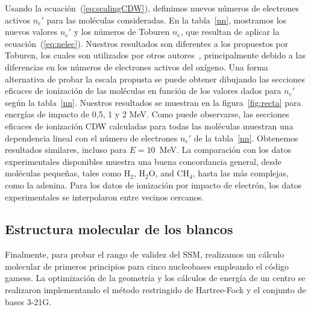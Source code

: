 Usando la ecuación~(\ref{eq:scalingCDW}), definimos nuevos números de 
electrones activos $n_e'$ para las moléculas consideradas. En la 
tabla~\ref{nn}, mostramos los nuevos valores $n_e'$ y los números de 
Toburen $n_e$, que resultan de aplicar la ecuación~(\ref{eq:nelec}). 
Nuestros resultados son diferentes a los propuestos por Toburen, los 
cuales son utilizados por otros autores~\cite{itoh2013}, principalmente 
debido a las diferencias en los números de electrones activos del 
oxígeno. Una forma alternativa de probar la escala propusta se puede
obtener dibujando las secciones eficaces de ionización de las moléculas 
en función de los valores dados para $n_e'$ según la tabla~\ref{nn}. 
Nuestros resultados se muestran en la figura~\ref{fig:recta} para 
energías de impacto de 0,5, 1 y 2 MeV. Como puede observarse, las 
secciones eficaces de ionización CDW calculadas para todas las moléculas 
muestran una dependencia lineal con el número de electrones $n_e'$ de 
la tabla~\ref{nn}. Obtenemos resultados similares, incluso para 
$E=10$~MeV. La comparación con los datos experimentales disponibles 
muestra una buena concordancia general, desde moléculas pequeñas, tales
como H$_2$, H$_2$O, and CH$_4$, hasta las más complejas, como la adenina. 
Para los datos de ionización por impacto de electrón, los datos 
experimentales se interpolaron entre vecinos cercanos. 


\subsection{Estructura molecular de los blancos}
\label{subsec:molcalculations}

Finalmente, para probar el rango de validez del SSM, realizamos un 
cálculo molecular de primeros principios para cinco nucleobases 
empleando el código {\sc gamess}. La optimización de la geometría y los 
cálculos de energía de un centro se realizaron implementando el método
restringido de Hartree-Fock y el conjunto de bases 3-21G. 

